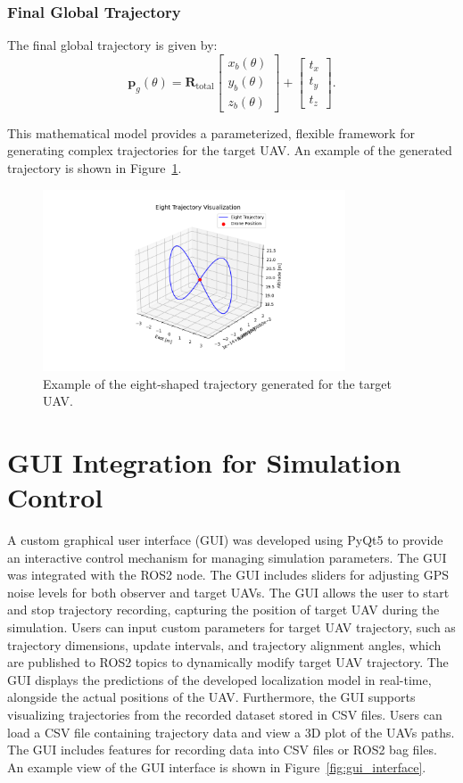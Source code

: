 \subsubsection{ Final Global Trajectory}
The final global trajectory is given by:
\[
\mathbf{p}_g(\theta) = \mathbf{R}_\text{total}
\begin{bmatrix}
    x_b(\theta) \\
    y_b(\theta) \\
    z_b(\theta)
\end{bmatrix}
+
\begin{bmatrix}
    t_x \\
    t_y \\
    t_z
\end{bmatrix}.
\]

This mathematical model provides a parameterized, flexible framework for generating complex trajectories for the target UAV. An example of the generated trajectory is shown in Figure~\ref{fig:eight_trajectory}.

\begin{figure}[H]
    \centering
    \includegraphics[width=0.8\textwidth]{Imgs/trajectory.png}
    \caption{Example of the eight-shaped trajectory generated for the target UAV.}
    \label{fig:eight_trajectory}
\end{figure}


\section{GUI Integration for Simulation Control}
A custom graphical user interface (GUI) was developed using PyQt5 to provide an interactive control mechanism for managing simulation parameters. The GUI was integrated with the ROS2 node. The GUI includes sliders for adjusting GPS noise levels for both observer and target UAVs. The GUI allows the user to start and stop trajectory recording, capturing the position of target UAV during the simulation. Users can input custom parameters for target UAV trajectory, such as trajectory dimensions, update intervals, and trajectory alignment angles, which are published to ROS2 topics to dynamically modify target UAV trajectory. The GUI displays the predictions of the developed localization model in real-time, alongside the actual positions of the UAV.  Furthermore, the GUI supports visualizing trajectories from the recorded dataset stored in CSV files. Users can load a CSV file containing trajectory data and view a 3D plot of the UAVs paths. The GUI includes features for recording data into CSV files or ROS2 bag files.
An example view of the GUI interface is shown in Figure~\ref{fig:gui_interface}.

